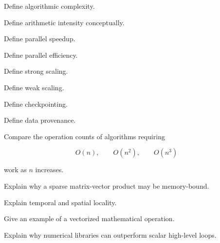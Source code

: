 \begin{exercise}[1]
Define algorithmic complexity.
\end{exercise}

\begin{exercise}[1]
Define arithmetic intensity conceptually.
\end{exercise}

\begin{exercise}[1]
Define parallel speedup.
\end{exercise}

\begin{exercise}[1]
Define parallel efficiency.
\end{exercise}

\begin{exercise}[1]
Define strong scaling.
\end{exercise}

\begin{exercise}[1]
Define weak scaling.
\end{exercise}

\begin{exercise}[1]
Define checkpointing.
\end{exercise}

\begin{exercise}[1]
Define data provenance.
\end{exercise}

\begin{exercise}[2]
Compare the operation counts of algorithms requiring

\[
O(n),
\qquad
O(n^2),
\qquad
O(n^3)
\]

work as \(n\) increases.
\end{exercise}

\begin{exercise}[2]
Explain why a sparse matrix-vector product may be memory-bound.
\end{exercise}

\begin{exercise}[2]
Explain temporal and spatial locality.
\end{exercise}

\begin{exercise}[2]
Give an example of a vectorized mathematical operation.
\end{exercise}

\begin{exercise}[2]
Explain why numerical libraries can outperform scalar high-level loops.
\end{exercise}

